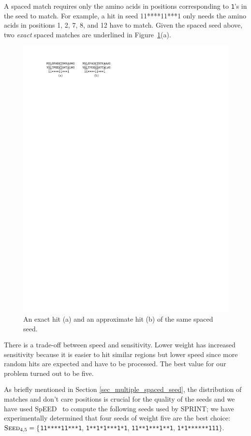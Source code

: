 A spaced match requires only the amino acids in positions corresponding to {\tt 1}'s in the seed to match. For example,  a hit in seed 11****11***1 only needs the amino acids in positions 1, 2, 7, 8, and 12 have to match. Given the spaced seed above, two \textit{exact} spaced matches are underlined in Figure~\ref{fig_s-match}(a).

\begin{figure}[h!] 
\centering
\includegraphics{img/fig_s-match.pdf}
\caption[Spaced-seed hits]{An exact hit (a) and an approximate hit (b) of the same spaced seed.\label{fig_s-match}}
\end{figure}

There is a trade-off between speed and sensitivity. Lower weight has increased sensitivity because it is easier to hit similar regions but lower speed since more random hits are expected and have to be processed. The best value for our problem turned out to be five.

As briefly mentioned in Section \ref{sec_multiple_spaced_seed}, the distribution of matches and don't care positions is crucial for the quality of the seeds and we have used SpEED~\cite{Ilie07_spacedSeeds,Ilie11_SpEED} to compute the following seeds used by SPRINT; we have experimentally determined that four seeds of weight five are the best choice: $\textsc{Seed}_{4,5} = \{$\texttt{11****11***1}, \texttt{1**1*1***1*1}, \texttt{11**1***1**1}, \texttt{1*1******111}$\}$.

